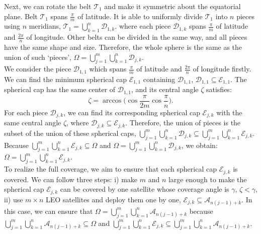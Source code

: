 \documentclass[final]{IEEEtran}
\begin{document}
\indent Next, we can rotate the belt $\mathcal{T}_1$ and make it symmetric about the equatorial plane. Belt $\mathcal{T}_1$ spans $\frac{\pi}{m}$ of latitude. It is able to uniformly divide $\mathcal{T}_1$ into $n$ pieces using $n$ meridians, \ie $\mathcal{T}_1=\bigcup_{k=1}^{n}\mathcal{D}_{1,k}$. where each piece $\mathcal{D}_{1,k}$ spans $\frac{\pi}{m}$ of latitude and $\frac{2\pi}{n}$ of longitude. Other belts can be divided in the same way, and all pieces have the same shape and size. Therefore, the whole sphere is the same as the union of such `pieces', \ie $\Omega=\bigcup_{j=1}^{m}\bigcup_{k=1}^{n}\mathcal{D}_{j,k}$.\\
\indent We consider the piece $\mathcal{D}_{1,1}$ which spans $\frac{\pi}{m}$ of latitude and $\frac{2\pi}{n}$ of longitude firstly. We can find the minimum spherical cap $\mathcal{E}_{1,1}$ containing $\mathcal{D}_{1,1}$, \ie $\mathcal{D}_{1,1}\subseteq \mathcal{E}_{1,1}$. The spherical cap has the same center of $\mathcal{D}_{1,1}$, and its central angle $\zeta$ satisfies:
\begin{equation}
    \zeta =\arccos{\bigg(\cos{\frac{\pi}{2m}}\cos{\frac{\pi}{n}}\bigg)}.
\end{equation}
For each piece $\mathcal{D}_{j,k}$, we can find its corresponding spherical cap $\mathcal{E}_{j,k}$ with the same central angle $\zeta$, where $\mathcal{D}_{j,k}\subseteq \mathcal{E}_{j,k}$. Therefore, the union of pieces is the subset of the union of these spherical caps, \ie $\bigcup_{j=1}^{m}\bigcup_{k=1}^{n}\mathcal{D}_{j,k}\subseteq \bigcup_{j=1}^{m}\bigcup_{k=1}^{n}\mathcal{E}_{j,k}$. Because $\bigcup_{j=1}^{m}\bigcup_{k=1}^{n}\mathcal{E}_{j,k}\subseteq \Omega$ and $\Omega=\bigcup_{j=1}^{m}\bigcup_{k=1}^{n}\mathcal{D}_{j,k}$, we obtain: $\Omega=\bigcup_{j=1}^{m}\bigcup_{k=1}^{n}\mathcal{E}_{j,k}$.\\
\indent To realize the full coverage, we aim to ensure that each spherical cap $\mathcal{E}_{j,k}$ is covered. We can follow three steps: i) make $m$ and $n$ large enough to make the spherical cap $\mathcal{E}_{j,k}$ can be covered by one satellite whose coverage angle is $\gamma$, \ie $\zeta< \gamma$, ii) use $m\times n$ LEO satellites and deploy them one by one, \ie $\mathcal{E}_{j,k}\subseteq \mathcal{A}_{n(j-1)+k}$. In this case, we can ensure that $\Omega=\bigcup_{j=1}^{m}\bigcup_{k=1}^{n}\mathcal{A}_{n(j-1)+k}$ because $\bigcup_{j=1}^{m}\bigcup_{k=1}^{n}\mathcal{A}_{n(j-1)+k}\subseteq \Omega$ and $\bigcup_{j=1}^{m}\bigcup_{k=1}^{n}\mathcal{E}_{j,k}\subseteq \bigcup_{j=1}^{m}\bigcup_{k=1}^{n}\mathcal{A}_{n(j-1)+k}$.\\
\end{document}
